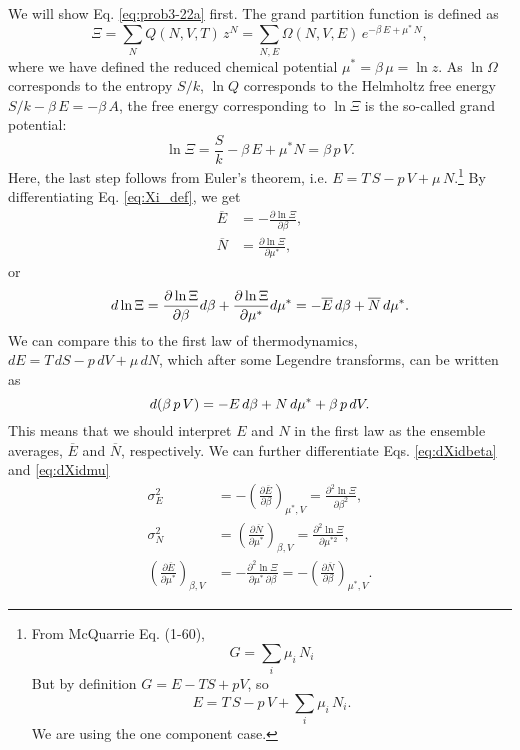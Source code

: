 \documentclass{article}
\begin{document}
We will show Eq. \eqref{eq:prob3-22a} first.
The grand partition function is defined as
\begin{equation}
\Xi
=
  \sum_{N} Q(N, V, T) \, z^N
=
  \sum_{N, E} \Omega(N, V, E) \, e^{-\beta \, E + \mu^* \, N}
,
  \label{eq:Xi_def}
\end{equation}
%
where we have defined the reduced chemical potential $\mu^* = \beta \, \mu = \ln z$.
%
As $\ln \Omega$ corresponds to the entropy $S/k$,
$\ln Q$ corresponds to the Helmholtz free energy $S/k - \beta \, E = -\beta \, A$,
the free energy corresponding to $\ln \Xi$
is the so-called grand potential:
%
\begin{equation}
  \ln \Xi
  = \frac{S}{k} - \beta \, E + \mu^* N
  = \beta \, p \, V
  .
  \label{eq:lnXi}
\end{equation}
Here, the last step follows from Euler's theorem,
i.e. $E = T \, S - p \, V + \mu \, N$.\footnote{
  From McQuarrie Eq. (1-60),
  $$
  G = \sum_i \mu_i \, N_i
  $$
  But by definition $G = E - TS + pV$, so
  $$
  E = T \, S - p \, V + \sum_i \mu_i \, N_i.
  $$
  We are using the one component case.
}
%
By differentiating Eq. \eqref{eq:Xi_def}, we get
%
\begin{align}
  \overline E &= -\frac{ \partial \ln \Xi } { \partial \beta }
  ,
  \label{eq:dXidbeta}
  \\
  \overline N &= \frac{ \partial \ln \Xi } { \partial \mu^* }
  ,
  \label{eq:dXidmu}
\end{align}
%
or
\begin{equation}
  d \ln \Xi
  =
  \frac{ \partial \ln \Xi } { \partial \beta } d\beta
  +
  \frac{ \partial \ln \Xi } { \partial \mu^* } d\mu^*
  = -\overline E \, d\beta + \overline N \, d\mu^*
  .
  \notag
\end{equation}
%
We can compare this to the first law of thermodynamics,
$dE = T \, dS - p \, dV + \mu \, dN$,
which after some Legendre transforms, can be written as
%
\begin{equation}
  d(\beta \, p \, V) = -E \, d\beta + N \, d\mu^* + \beta \, p \, dV
  .
  \notag
\end{equation}
This means that we should interpret $E$ and $N$ in the first law
as the ensemble averages, $\overline E$ and $\overline N$, respectively.
%
We can further differentiate Eqs. \eqref{eq:dXidbeta} and \eqref{eq:dXidmu}
%
\begin{align}
  \sigma_E^2
  &=
  -\left( \frac{ \partial \overline E } { \partial \beta } \right)_{\mu^*, V}
  = \frac{ \partial^2 \ln \Xi } { \partial \beta^2 }
  ,
  \label{eq:varE}
  \\
  \sigma_N^2
  &= \left( \frac{ \partial \overline N } { \partial \mu^* } \right)_{\beta, V}
  = \frac{ \partial^2 \ln \Xi } { \partial \mu^{*2} }
  \label{eq:varN}
  ,
  \\
  \left( \frac{ \partial \overline E } { \partial \mu^* } \right)_{\beta, V}
  &= -\frac{ \partial^2 \ln \Xi } { \partial \mu^* \, \partial \beta }
  = - \left( \frac{ \partial \overline N } { \partial \beta } \right)_{\mu^*, V}
  \label{eq:covEN}
  .
\end{align}
\end{document}

